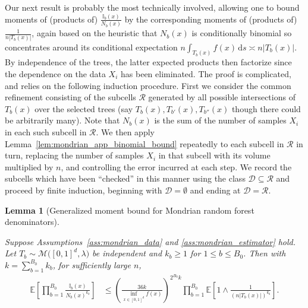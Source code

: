 \documentclass[11pt,lof]{puthesis}
\newcommand{\E}{\ensuremath{\mathbb{E}}}
\newcommand{\I}{\ensuremath{\mathbb{I}}}
\newcommand{\cR}{\ensuremath{\mathcal{R}}}
\newcommand{\cM}{\ensuremath{\mathcal{M}}}
\newcommand{\cD}{\ensuremath{\mathcal{D}}}
\newcommand{\diff}[1]{\,\mathrm{d}#1}
\theoremstyle{break}
\newtheorem{lemma}{Lemma}[section]
\theoremstyle{proof}
\begin{document}
Our next result is probably the most technically involved,
allowing one to bound moments of
(products of) $\frac{\I_b(x)}{N_b(x)}$ by the corresponding moments of
(products of) $\frac{1}{n |T_b(x)|}$, again based on the heuristic
that $N_b(x)$ is conditionally binomial so concentrates around
its conditional expectation
$n \int_{T_b(x)} f(x) \diff s \asymp n |T_b(x)|$.
By independence of the trees,
the latter expected products then factorize
since the dependence on the data $X_i$ has been eliminated.
The proof is complicated, and relies on the following induction procedure.
First we consider the common refinement consisting of the
subcells $\cR$ generated by all possible intersections
of $T_b(x)$ over the selected trees
(say $T_{b}(x), T_{b'}(x), T_{b''}(x)$
though there could be arbitrarily many).
Note that $N_b(x)$ is the sum of the number of
samples $X_i$ in each such subcell in $\cR$.
We then apply Lemma~\ref{lem:mondrian_app_binomial_bound} repeatedly
to each subcell in $\cR$ in turn, replacing
the number of samples $X_i$ in that subcell with its volume
multiplied by $n$, and controlling the error incurred at each step.
We record the subcells which have been ``checked'' in this manner
using the class $\cD \subseteq \cR$ and proceed by finite induction,
beginning with $\cD = \emptyset$ and ending at $\cD = \cR$.

\begin{lemma}[Generalized moment bound for
  Mondrian random forest denominators]%
  \label{lem:mondrian_app_moment_denominator}

  Suppose Assumptions~\ref{ass:mondrian_data}
  and \ref{ass:mondrian_estimator} hold.
  Let $T_b \sim \cM\big([0,1]^d, \lambda\big)$
  be independent and $k_b \geq 1$ for $1 \leq b \leq B_0$.
  Then with $k = \sum_{b=1}^{B_0} k_b$,
  for sufficiently large $n$,
  \begin{align*}
    \E\left[
      \prod_{b=1}^{B_0}
      \frac{\I_b(x)}{N_b(x)^{k_b}}
    \right]
    &\leq
    \left( \frac{36k}{\inf_{x \in [0,1]^d} f(x)} \right)^{2^{B_0} k}
    \prod_{b=1}^{B_0}
    \E \left[
      1 \wedge
      \frac{1}{(n |T_b(x)|)^{k_b}}
    \right].
  \end{align*}
\end{lemma}
\end{document}
